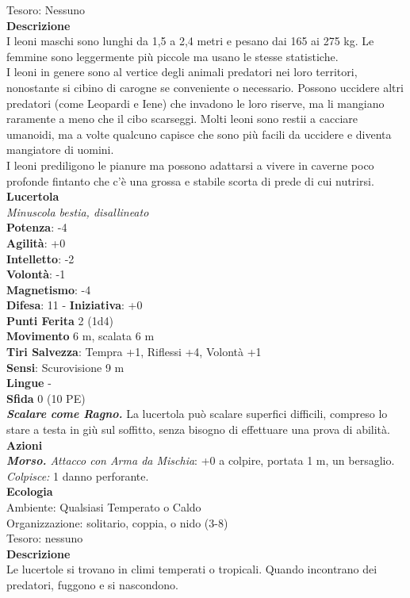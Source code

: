 \begin{multicols}{2}
Tesoro: Nessuno\\
\textbf{Descrizione}\\
I leoni maschi sono lunghi da 1,5 a 2,4 metri e pesano dai 165 ai 275 kg. Le femmine sono leggermente più piccole ma usano le stesse statistiche.\\
I leoni in genere sono al vertice degli animali predatori nei loro territori, nonostante si cibino di carogne se conveniente o necessario. Possono uccidere altri predatori (come Leopardi e Iene) che invadono le loro riserve, ma li mangiano raramente a meno che il cibo scarseggi. Molti leoni sono restii a cacciare umanoidi, ma a volte qualcuno capisce che sono più facili da uccidere e diventa mangiatore di uomini.\\
I leoni prediligono le pianure ma possono adattarsi a vivere in caverne poco profonde fintanto che c’è una grossa e stabile scorta di prede di cui nutrirsi. \\

\medskip\textbf{Lucertola}\\
\emph{Minuscola bestia, disallineato}\\
\textbf{Potenza}: -4\\
\textbf{Agilità}: +0\\
\textbf{Intelletto}: -2\\
\textbf{Volontà}: -1\\
\textbf{Magnetismo}: -4\\
\textbf{Difesa}: 11 - \textbf{Iniziativa}: +0\\
\textbf{Punti Ferita} 2 (1d4)\\
\textbf{Movimento} 6 m, scalata 6 m\\
\textbf{Tiri Salvezza}:  Tempra +1, Riflessi +4, Volontà +1 \\
\textbf{Sensi}: Scurovisione 9 m\\
\textbf{Lingue} -\\
\textbf{Sfida} 0 (10 PE)\smallskip\\
\emph{\textbf{Scalare come Ragno.}} La lucertola può scalare superfici difficili, compreso lo stare a testa in giù sul soffitto, senza bisogno di effettuare una prova di abilità.\\
\smallskip\textbf{Azioni}\\
\emph{\textbf{Morso.} Attacco con Arma da Mischia}: +0 a colpire, portata 1 m, un bersaglio.\\
\emph{Colpisce:} 1 danno perforante.\\
\textbf{Ecologia}\\
Ambiente: Qualsiasi Temperato o Caldo\\
Organizzazione: solitario, coppia, o nido (3-8)\\
Tesoro: nessuno\\
\textbf{Descrizione}\\
Le lucertole si trovano in climi temperati o tropicali. Quando incontrano dei predatori, fuggono e si nascondono. \\


\end{multicols}
